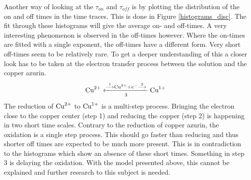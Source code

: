 \documentclass[twoside,single]{lion-msc}
\begin{document}
Another way of looking at the $\tau_{on}$ and  $\tau_{off}$ is by plotting the distribution of the on and off times in the time traces. This is done in Figure \ref{histograms_disc}. The fit through these histograms will give the average on- and off-times. A very interesting phenomenon is observed in the off-times however. Where the on-times are fitted with a single exponent, the off-times have a different form. Very short off-times seem to be relatively rare. To get a deeper understanding of this a closer look has to be taken at the electron transfer process between the solution and the copper azurin.
\begin{equation}\label{ox_pros}
\textup{Cu}^{2+}\xleftarrow[3]{\overset{1}{\longrightarrow}\textup{Cu}^{2+}+ e^{-}\overset{2}{\longrightarrow}}\textup{Cu}^{1+}
\end{equation}
The reduction of $\textup{Cu}^{2+}$ to $\textup{Cu}^{1+}$ is a multi-step process. Bringing the electron close to the copper center (step 1) and reducing the copper (step 2) is happening in two short time scales. Contrary to the reduction of copper azurin, the oxidation is a single step process. This should go faster than reducing and thus shorter off times are expected to be much more present. This is in contradiction to the histograms which show an absence of these short times. Something in step 3 is delaying the oxidation. With the model presented above, this cannot be explained and further research to this subject is needed.
\end{document}
